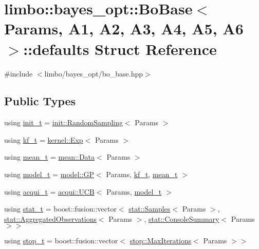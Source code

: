 \hypertarget{structlimbo_1_1bayes__opt_1_1_bo_base_1_1defaults}{}\section{limbo\+:\+:bayes\+\_\+opt\+:\+:Bo\+Base$<$ Params, A1, A2, A3, A4, A5, A6 $>$\+:\+:defaults Struct Reference}
\label{structlimbo_1_1bayes__opt_1_1_bo_base_1_1defaults}


{\ttfamily \#include $<$limbo/bayes\+\_\+opt/bo\+\_\+base.\+hpp$>$}

\subsection*{Public Types}
\begin{DoxyCompactItemize}
\item 
using \hyperlink{structlimbo_1_1bayes__opt_1_1_bo_base_1_1defaults_afab889d523b8c28d1161079a5a453f79}{init\+\_\+t} = \hyperlink{structlimbo_1_1init_1_1_random_sampling}{init\+::\+Random\+Sampling}$<$ Params $>$
\item 
using \hyperlink{structlimbo_1_1bayes__opt_1_1_bo_base_1_1defaults_a74f559358b99209461a1aac1e0dacb1f}{kf\+\_\+t} = \hyperlink{structlimbo_1_1kernel_1_1_exp}{kernel\+::\+Exp}$<$ Params $>$
\item 
using \hyperlink{structlimbo_1_1bayes__opt_1_1_bo_base_1_1defaults_ae8b922abc8e126f785e1001342cf47ae}{mean\+\_\+t} = \hyperlink{structlimbo_1_1mean_1_1_data}{mean\+::\+Data}$<$ Params $>$
\item 
using \hyperlink{structlimbo_1_1bayes__opt_1_1_bo_base_1_1defaults_aa9a30c408b869fd46861b028b6325b4a}{model\+\_\+t} = \hyperlink{classlimbo_1_1model_1_1_g_p}{model\+::\+G\+P}$<$ Params, \hyperlink{structlimbo_1_1bayes__opt_1_1_bo_base_1_1defaults_a74f559358b99209461a1aac1e0dacb1f}{kf\+\_\+t}, \hyperlink{structlimbo_1_1bayes__opt_1_1_bo_base_1_1defaults_ae8b922abc8e126f785e1001342cf47ae}{mean\+\_\+t} $>$
\item 
using \hyperlink{structlimbo_1_1bayes__opt_1_1_bo_base_1_1defaults_a7728ece1763ffbcac4e37f219047dcb1}{acqui\+\_\+t} = \hyperlink{classlimbo_1_1acqui_1_1_u_c_b}{acqui\+::\+U\+C\+B}$<$ Params, \hyperlink{structlimbo_1_1bayes__opt_1_1_bo_base_1_1defaults_aa9a30c408b869fd46861b028b6325b4a}{model\+\_\+t} $>$
\item 
using \hyperlink{structlimbo_1_1bayes__opt_1_1_bo_base_1_1defaults_a3c475362a937e011e02c715e8edbf2d1}{stat\+\_\+t} = boost\+::fusion\+::vector$<$ \hyperlink{structlimbo_1_1stat_1_1_samples}{stat\+::\+Samples}$<$ Params $>$, \hyperlink{structlimbo_1_1stat_1_1_aggregated_observations}{stat\+::\+Aggregated\+Observations}$<$ Params $>$, \hyperlink{structlimbo_1_1stat_1_1_console_summary}{stat\+::\+Console\+Summary}$<$ Params $>$$>$
\item 
using \hyperlink{structlimbo_1_1bayes__opt_1_1_bo_base_1_1defaults_aabb9a88029b7b3cba6d1bafe3dfadaf5}{stop\+\_\+t} = boost\+::fusion\+::vector$<$ \hyperlink{structlimbo_1_1stop_1_1_max_iterations}{stop\+::\+Max\+Iterations}$<$ Params $>$$>$
\end{DoxyCompactItemize}


